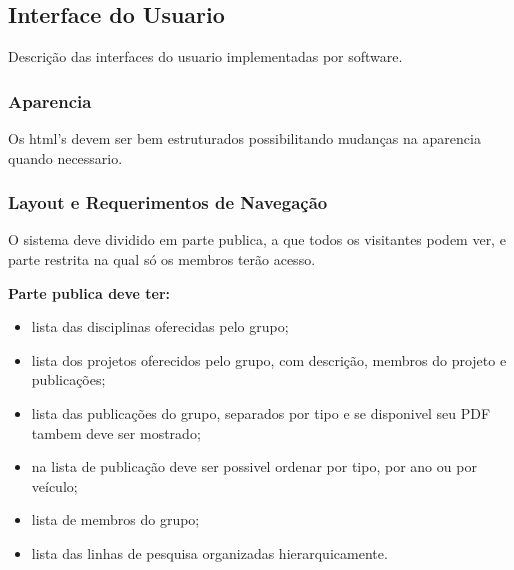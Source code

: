 \documentclass[11pt, a4paper]{article}
\begin{document}
		\subsection{Interface do Usuario}
			Descrição das interfaces do usuario implementadas por software.
			
			\subsubsection{Aparencia}
				Os html's devem ser bem estruturados possibilitando mudanças 
				na aparencia quando necessario.
				
			\subsubsection{Layout e Requerimentos de Navegação}
				O sistema deve dividido em parte publica, a que todos os 
				visitantes podem ver, e parte restrita na qual só os membros 
				terão acesso.
				
				\noindent \textbf{Parte publica deve ter:}
				\begin{itemize}
					\item lista das disciplinas oferecidas pelo grupo;
					\item lista dos projetos oferecidos pelo grupo, com 
					descrição, membros do projeto e publicações;
					\item lista das publicações do grupo, separados por tipo e 
					se disponivel seu PDF tambem deve ser mostrado;
					\item na lista de publicação deve ser possivel ordenar por 
					tipo, por ano ou por veículo;
					\item lista de  membros do grupo;
					\item lista das linhas de pesquisa organizadas 
					hierarquicamente.
				\end{itemize}
				
\end{document}
